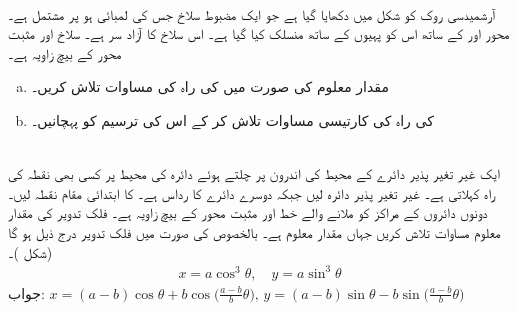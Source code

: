 \\
آرشمیدسی روک کو شکل  میں دکھایا گیا ہے جو ایک مضبوط سلاخ جس کی لمبائی  ہو پر مشتمل ہے۔محور  اور   کے ساتھ اس کو پہیوں کے ساتھ منسلک کیا گیا ہے۔ اس سلاخ کا آزاد سر  ہے۔ سلاخ اور مثبت  محور کے بیچ زاویہ  ہے۔
\begin{enumerate}[a.]
\item
مقدار معلوم  کی صورت میں  کی راہ کی مساوات تلاش کریں۔
\item
{} کی راہ کی کارتیسی مساوات تلاش کر کے اس کی ترسیم کو پہچانیں۔
\end{enumerate}
\\
ایک غیر تغیر پذیر دائرے کے محیط کی اندرون پر چلتے ہوئے دائرہ کی محیط پر کسی بھی نقطہ  کی راہ  کہلاتی ہے۔ غیر تغیر پذیر دائرہ  لیں جبکہ دوسرے دائرے کا رداس  ہے۔  کا ابتدائی مقام نقطہ  لیں۔ دونوں دائروں کے مراکز کو ملانے والے خط اور مثبت  محور کے بیچ زاویہ  ہے۔  فلک تدویر کی مقدار معلوم مساوات تلاش کریں جہاں مقدار معلوم  ہے۔ بالخصوص  کی صورت میں فلک تدویر درج ذیل  ہو گا (شکل )۔
\begin{align*}
x=a\cos^3\theta,\quad y=a\sin^3\theta
\end{align*}
جواب:\quad
$x=(a-b)\cos \theta+b\cos\big(\tfrac{a-b}{b}\theta\big),\, y=(a-b)\sin\theta-b\sin\big(\tfrac{a-b}{b}\theta\big)$
